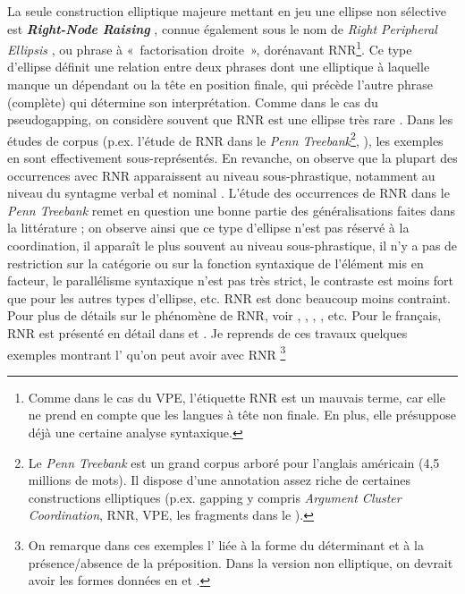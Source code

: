 La seule construction elliptique majeure mettant en jeu une ellipse non sélective est \textbf{\textit{Right-Node Raising}} \citep{Postal1974}, connue également sous le nom de \textit{Right Peripheral Ellipsis} \citep{Hohle1991}, ou phrase à «~factorisation droite~», dorénavant RNR\footnote{Comme dans le cas du VPE, l’étiquette RNR est un mauvais terme, car elle ne prend en compte que les langues à tête non finale. En plus, elle présuppose déjà une certaine analyse syntaxique.}. Ce type d’ellipse définit une relation entre deux phrases dont une elliptique à laquelle manque un dépendant  ou la tête  en position finale, qui précède l’autre phrase (complète) qui détermine son interprétation. Comme dans le cas du pseudogapping, on considère souvent que RNR est une ellipse très rare \citep{Meyer1995}. Dans les études de corpus (p.ex. l’étude de RNR dans le \textit{Penn Treebank}\footnote{Le \textit{Penn Treebank} est un grand corpus arboré pour l’anglais américain (4,5 millions de mots). Il dispose d’une annotation assez riche de certaines constructions elliptiques (p.ex. gapping y compris \textit{Argument Cluster Coordination}, RNR, VPE, les fragments dans le ).}, \citealt{Bilbiie2013b}), les exemples en  sont effectivement sous-représentés. En revanche, on observe que la plupart des occurrences avec RNR apparaissent au niveau sous-phrastique, notamment au niveau du syntagme verbal  et nominal . L’étude des occurrences de RNR dans le \textit{Penn Treebank} remet en question une bonne partie des généralisations faites dans la littérature ; on observe ainsi que ce type d’ellipse n’est pas réservé à la coordination, il apparaît le plus souvent au niveau sous-phrastique, il n’y a pas de restriction sur la catégorie ou sur la fonction syntaxique de l’élément mis en facteur, le parallélisme syntaxique n’est pas très strict, le contraste est moins fort que pour les autres types d’ellipse, etc. RNR est donc beaucoup moins contraint. Pour plus de détails sur le phénomène de RNR, voir \citet{Abbot1976}, \citet{Hartmann2000}, \citet{ChavesEtAl2008}, \citet{Chaves2014}, etc. Pour le français, RNR est présenté en détail dans \citet{AbeilleEtAl2010} et \citet{AbeilleEtAl2016}. Je reprends de ces travaux quelques exemples montrant l’ qu’on peut avoir avec RNR \footnote{On remarque dans ces exemples l’ liée à la forme du déterminant et à la présence/absence de la préposition. Dans la version non elliptique, on devrait avoir les formes données en  et .

}
